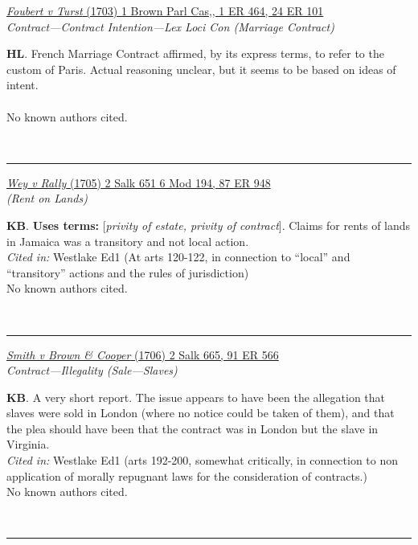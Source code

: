 \documentclass[twoside]{article}
\begin{document}
        \begin{small}
        \begin{center}
        \href{https://heinonline.org/HOL/P?h=hein.engrep/engra0001&i=472}{\textit{Foubert v Turst} (1703) 1 Brown Parl Cas,, 1 ER 464,  24 ER 101} \label{27} \\ 
\textit{Contract---Contract Intention---Lex Loci Con (Marriage Contract)}\\
        \end{center}
        \textbf{HL}. French Marriage Contract affirmed, by its express terms, to refer to the custom of Paris. Actual reasoning unclear, but it seems to be based on ideas of intent.\\\\No known authors cited.
        \end{small}\\
        \rule{\textwidth}{0.5pt}
        

        \begin{small}
        \begin{center}
        \href{https://heinonline.org/HOL/P?h=hein.engrep/engrf0087&i=952}{\textit{Wey v Rally} (1705) 2 Salk 651 6 Mod 194, 87 ER 948} \label{14} \\ 
\textit{ (Rent on Lands)}\\
        \end{center}
        \textbf{KB}.  \textbf{Uses terms: }[\textit{privity of estate, privity of contract}]. Claims for rents of lands in Jamaica was a transitory and not local action.\\\textit{Cited in: }Westlake Ed1 (At arts 120-122, in connection to “local” and “transitory” actions and the rules of jurisdiction)\\No known authors cited.
        \end{small}\\
        \rule{\textwidth}{0.5pt}
        

        \begin{small}
        \begin{center}
        \href{https://heinonline.org/HOL/P?h=hein.engrep/engrf0091&i=570}{\textit{Smith v Brown \& Cooper} (1706) 2 Salk 665, 91 ER 566} \label{29} \\ 
\textit{Contract---Illegality (Sale---Slaves)}\\
        \end{center}
        \textbf{KB}. A very short report. The issue appears to have been the allegation that slaves were sold in London (where no notice could be taken of them), and that the plea should have been that the contract was in London but the slave in Virginia.\\\textit{Cited in: }Westlake Ed1 (arts 192-200, somewhat critically, in connection to non application of morally repugnant laws for the consideration of contracts.)\\No known authors cited.
        \end{small}\\
        \rule{\textwidth}{0.5pt}
        
\end{document}

